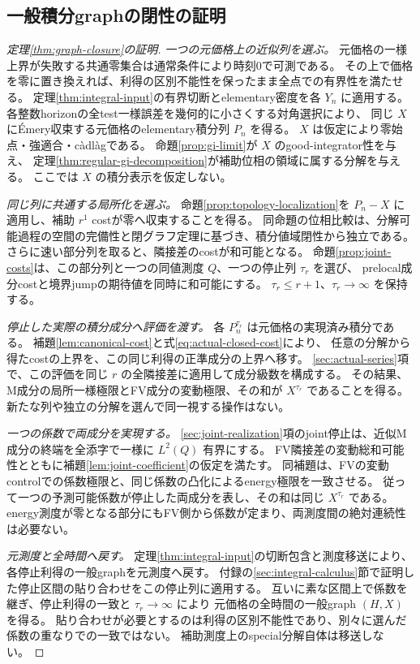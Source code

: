 \subsection{一般積分graphの閉性の証明}
\label{sec:closure-proof}
\begin{proof}[定理\ref{thm:graph-closure}の証明]
\emph{一つの元価格上の近似列を選ぶ。}
元価格の一様上界が失敗する共通零集合は通常条件により時刻0で可測である。
その上で価格を零に置き換えれば、利得の区別不能性を保ったまま全点での有界性を満たせる。
定理\ref{thm:integral-input}の有界切断とelementary密度を各 $Y_n$ に適用する。
各整数horizonの全test一様誤差を幾何的に小さくする対角選択により、
同じ $X$ にÉmery収束する元価格のelementary積分列 $P_n$ を得る。
$X$ は仮定により零始点・強適合・càdlàgである。
命題\ref{prop:gi-limit}が $X$ のgood-integrator性を与え、
定理\ref{thm:regular-gi-decomposition}が補助位相の領域に属する分解を与える。
ここでは $X$ の積分表示を仮定しない。

\emph{同じ列に共通する局所化を選ぶ。}
命題\ref{prop:topology-localization}を $P_n-X$ に適用し、補助 $r^1$ costが零へ収束することを得る。
同命題の位相比較は、分解可能過程の空間の完備性と閉グラフ定理に基づき、積分値域閉性から独立である。
さらに速い部分列を取ると、隣接差のcostが和可能となる。
命題\ref{prop:joint-costs}は、この部分列と一つの同値測度 $Q$、一つの停止列 $\tau_r$ を選び、
prelocal成分costと境界jumpの期待値を同時に和可能にする。
$\tau_r\leq r+1$、$\tau_r\to\infty$ を保持する。

\emph{停止した実際の積分成分へ評価を渡す。}
各 $P_n^{\tau_r}$ は元価格の実現済み積分である。
補題\ref{lem:canonical-cost}と式\eqref{eq:actual-closed-cost}により、
任意の分解から得たcostの上界を、この同じ利得の正準成分の上界へ移す。
\ref{sec:actual-series}項で、この評価を同じ $r$ の全隣接差に適用して成分級数を構成する。
その結果、M成分の局所一様極限とFV成分の変動極限、その和が $X^{\tau_r}$ であることを得る。
新たな列や独立の分解を選んで同一視する操作はない。

\emph{一つの係数で両成分を実現する。}
\ref{sec:joint-realization}項のjoint停止は、近似M成分の終端を全添字で一様に $L^2(Q)$ 有界にする。
FV隣接差の変動総和可能性とともに補題\ref{lem:joint-coefficient}の仮定を満たす。
同補題は、FVの変動controlでの係数極限と、同じ係数の凸化によるenergy極限を一致させる。
従って一つの予測可能係数が停止した両成分を表し、その和は同じ $X^{\tau_r}$ である。
energy測度が零となる部分にもFV側から係数が定まり、両測度間の絶対連続性は必要ない。

\emph{元測度と全時間へ戻す。}
定理\ref{thm:integral-input}の切断包含と測度移送により、各停止利得の一般graphを元測度へ戻す。
付録の\ref{sec:integral-calculus}節で証明した停止区間の貼り合わせをこの停止列に適用する。
互いに素な区間上で係数を継ぎ、停止利得の一致と $\tau_r\to\infty$ により
元価格の全時間の一般graph $(H,X)$ を得る。
貼り合わせが必要とするのは利得の区別不能性であり、別々に選んだ係数の重なりでの一致ではない。
補助測度上のspecial分解自体は移送しない。
\end{proof}


